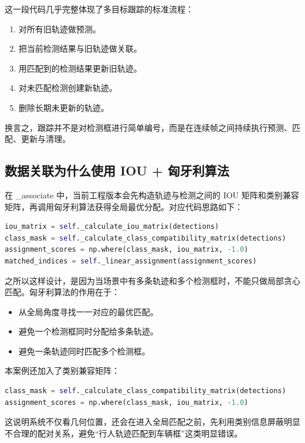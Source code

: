 这一段代码几乎完整体现了多目标跟踪的标准流程：

\begin{enumerate}
\def\labelenumi{\arabic{enumi}.}
\tightlist
\item
  对所有旧轨迹做预测。
\item
  把当前检测结果与旧轨迹做关联。
\item
  用匹配到的检测结果更新旧轨迹。
\item
  对未匹配检测创建新轨迹。
\item
  删除长期未更新的轨迹。
\end{enumerate}

换言之，跟踪并不是对检测框进行简单编号，而是在连续帧之间持续执行预测、匹配、更新与清理。

\subsection{数据关联为什么使用 IOU +
匈牙利算法}\label{src-experiment-case2-h49}

在 \_associate 中，当前工程版本会先构造轨迹与检测之间的 IOU
矩阵和类别兼容矩阵，再调用匈牙利算法获得全局最优分配。对应代码思路如下：

\begin{lstlisting}[language=Python]
iou_matrix = self._calculate_iou_matrix(detections)
class_mask = self._calculate_class_compatibility_matrix(detections)
assignment_scores = np.where(class_mask, iou_matrix, -1.0)
matched_indices = self._linear_assignment(assignment_scores)
\end{lstlisting}

之所以这样设计，是因为当场景中有多条轨迹和多个检测框时，不能只做局部贪心匹配。匈牙利算法的作用在于：

\begin{itemize}
\tightlist
\item
  从全局角度寻找一一对应的最优匹配。
\item
  避免一个检测框同时分配给多条轨迹。
\item
  避免一条轨迹同时匹配多个检测框。
\end{itemize}

本案例还加入了类别兼容矩阵：

\begin{lstlisting}[language=Python]
class_mask = self._calculate_class_compatibility_matrix(detections)
assignment_scores = np.where(class_mask, iou_matrix, -1.0)
\end{lstlisting}

这说明系统不仅看几何位置，还会在进入全局匹配之前，先利用类别信息屏蔽明显不合理的配对关系，避免``行人轨迹匹配到车辆框''这类明显错误。

